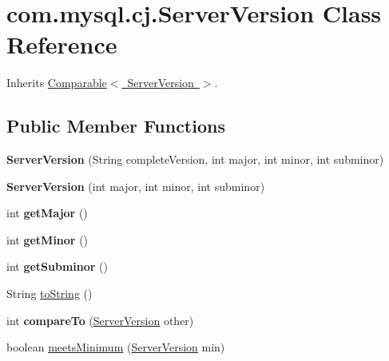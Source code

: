 \hypertarget{classcom_1_1mysql_1_1cj_1_1_server_version}{}\section{com.\+mysql.\+cj.\+Server\+Version Class Reference}
\label{classcom_1_1mysql_1_1cj_1_1_server_version}


Inherits \mbox{\hyperlink{class_comparable}{Comparable$<$ Server\+Version $>$}}.

\subsection*{Public Member Functions}
\begin{DoxyCompactItemize}
\item 
\mbox{\label{classcom_1_1mysql_1_1cj_1_1_server_version_a958c017aeaff68e3129d98c08c9428bc}} 
{\bfseries Server\+Version} (String complete\+Version, int major, int minor, int subminor)
\item 
\mbox{\label{classcom_1_1mysql_1_1cj_1_1_server_version_a7c16c47ebd3efda6d118efed484aed12}} 
{\bfseries Server\+Version} (int major, int minor, int subminor)
\item 
\mbox{\label{classcom_1_1mysql_1_1cj_1_1_server_version_afaaface05180f229b80bdd95c0a11113}} 
int {\bfseries get\+Major} ()
\item 
\mbox{\label{classcom_1_1mysql_1_1cj_1_1_server_version_a53bc82dac08a5c6446b1750ef48872eb}} 
int {\bfseries get\+Minor} ()
\item 
\mbox{\label{classcom_1_1mysql_1_1cj_1_1_server_version_a753b8e6fb4e9546cb331dd6b3b2d70e4}} 
int {\bfseries get\+Subminor} ()
\item 
String \mbox{\hyperlink{classcom_1_1mysql_1_1cj_1_1_server_version_ac6732acde7ab4125a366f4c6d2f957f0}{to\+String}} ()
\item 
\mbox{\label{classcom_1_1mysql_1_1cj_1_1_server_version_a4c7863cc27ebd138be35a2959eb2adb4}} 
int {\bfseries compare\+To} (\mbox{\hyperlink{classcom_1_1mysql_1_1cj_1_1_server_version}{Server\+Version}} other)
\item 
boolean \mbox{\hyperlink{classcom_1_1mysql_1_1cj_1_1_server_version_abc8b53b9a5a5bf7acc4665d620c07fda}{meets\+Minimum}} (\mbox{\hyperlink{classcom_1_1mysql_1_1cj_1_1_server_version}{Server\+Version}} min)
\end{DoxyCompactItemize}
